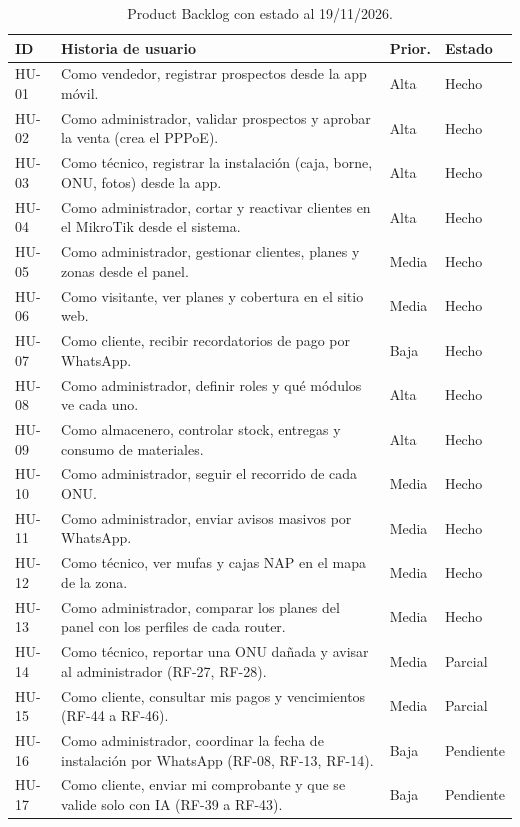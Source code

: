\begin{table}[H]
\centering
\caption{Product Backlog con estado al 19/11/2026.}
\label{tab:ce02-e4-backlog}
\small
\begin{tabularx}{\textwidth}{L{1.1cm}XC{1.2cm}L{1.8cm}}
\toprule
\textbf{ID} & \textbf{Historia de usuario} & \textbf{Prior.} & \textbf{Estado} \\
\midrule
HU-01 & Como vendedor, registrar prospectos desde la app móvil. & Alta & Hecho \\
HU-02 & Como administrador, validar prospectos y aprobar la venta (crea el PPPoE). & Alta & Hecho \\
HU-03 & Como técnico, registrar la instalación (caja, borne, ONU, fotos) desde la app. & Alta & Hecho \\
HU-04 & Como administrador, cortar y reactivar clientes en el MikroTik desde el sistema. & Alta & Hecho \\
HU-05 & Como administrador, gestionar clientes, planes y zonas desde el panel. & Media & Hecho \\
HU-06 & Como visitante, ver planes y cobertura en el sitio web. & Media & Hecho \\
HU-07 & Como cliente, recibir recordatorios de pago por WhatsApp. & Baja & Hecho \\
HU-08 & Como administrador, definir roles y qué módulos ve cada uno. & Alta & Hecho \\
HU-09 & Como almacenero, controlar stock, entregas y consumo de materiales. & Alta & Hecho \\
HU-10 & Como administrador, seguir el recorrido de cada ONU. & Media & Hecho \\
HU-11 & Como administrador, enviar avisos masivos por WhatsApp. & Media & Hecho \\
HU-12 & Como técnico, ver mufas y cajas NAP en el mapa de la zona. & Media & Hecho \\
HU-13 & Como administrador, comparar los planes del panel con los perfiles de cada router. & Media & Hecho \\
HU-14 & Como técnico, reportar una ONU dañada y avisar al administrador (RF-27, RF-28). & Media & Parcial \\
HU-15 & Como cliente, consultar mis pagos y vencimientos (RF-44 a RF-46). & Media & Parcial \\
HU-16 & Como administrador, coordinar la fecha de instalación por WhatsApp (RF-08, RF-13, RF-14). & Baja & Pendiente \\
HU-17 & Como cliente, enviar mi comprobante y que se valide solo con IA (RF-39 a RF-43). & Baja & Pendiente \\
\bottomrule
\end{tabularx}
\end{table}

